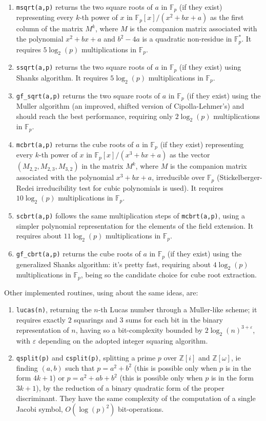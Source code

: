 \documentclass[a4paper,11pt,leqno,fleqn]{artikel3}
\begin{document}
\begin{enumerate}
\item \verb!msqrt(a,p)! returns the two square roots of $a$ in $\mathbb{F}_p$ (if they exist) representing every $k$-th power of $x$ in $\mathbb{F}_{p}[x]/(x^2+bx+a)$ as the first column of the matrix $M^k$, where $M$ is the companion matrix associated with the polynomial $x^2+bx+a$ and $b^2-4a$ is a quadratic non-residue in $\mathbb{F}_p^*$. It requires $5 \log_2(p)$ multiplications in $\mathbb{F}_p$.
\item \verb!ssqrt(a,p)! returns the two square roots of $a$ in $\mathbb{F}_p$ (if they exist) using Shanks algorithm. It requires $5 \log_2(p)$ multiplications in $\mathbb{F}_p$.
\item \verb!gf_sqrt(a,p)! returns the two square roots of $a$ in $\mathbb{F}_p$ (if they exist) using the Muller algorithm (an improved, shifted version of Cipolla-Lehmer's) and should reach the best performance, requiring only $2 \log_2(p)$ multiplications in $\mathbb{F}_p$.
\item \verb!mcbrt(a,p)! returns the cube roots of $a$ in $\mathbb{F}_p$ (if they exist) representing every $k$-th power of $x$ in $\mathbb{F}_{p}[x]/(x^3+bx+a)$ as the vector $(M_{2,2},M_{2,3},M_{3,2})$ in the matrix $M^k$, where $M$ is the companion matrix associated with the polynomial $x^3+bx+a$, irreducible over $\mathbb{F}_p$ (Stickelberger-Redei irreducibility test for cubic polynomials is used). It requires $10 \log_2(p)$ multiplications in $\mathbb{F}_p$.
\item \verb!scbrt(a,p)! follows the same multiplication steps of \verb!mcbrt(a,p)!, using a simpler polynomial representation for the elements of the field extension. It requires about $11 \log_2(p)$ multiplications in $\mathbb{F}_p$.
\item \verb!gf_cbrt(a,p)! returns the cube roots of $a$ in $\mathbb{F}_p$ (if they exist) using the generalized Shanks algorithm: it's pretty fast, requiring about $4 \log_2(p)$ multiplications in $\mathbb{F}_p$, being so the candidate choice for cube root extraction.
\end{enumerate}
Other implemented routines, using about the same ideas, are:
\begin{enumerate}
\item \verb!lucas(n)!, returning the $n$-th Lucas number through a Muller-like scheme; it requires exactly $2$ squarings and $3$ sums for each bit in the binary representation of $n$, having so a bit-complexity bounded by $2\log_2(n)^{3+\varepsilon}$, with $\varepsilon$ depending on the adopted integer squaring algorithm.
\item \verb!qsplit(p)! and \verb!csplit(p)!, splitting a prime $p$ over $\mathbb{Z}[i]$ and $\mathbb{Z}[\omega]$, ie finding $(a,b)$ such that $p=a^2+b^2$ (this is possible only when $p$ is in the form $4k+1$) or $p=a^2+ab+b^2$ (this is possible only when $p$ is in the form $3k+1$), by the reduction of a binary quadratic form of the proper discriminant. They have the same complexity of the computation of a single Jacobi symbol, $O(\log(p)^2)$ bit-operations.
\end{enumerate}
\vspace{1cm}
\end{document}
